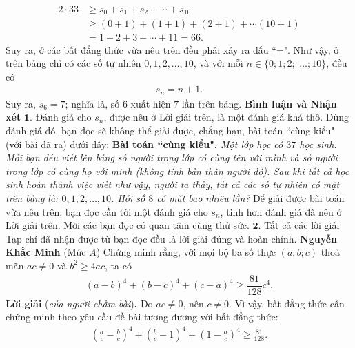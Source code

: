 \begin{multicols}{2}
	\begin{align*}
		2 \cdot 33 &\ge {s_0} + {s_1} + {s_2} +  \cdots  + {s_{10}} \\
		&\ge \left(\! {0 \!+\! 1}\! \right) \!+\! \left( \!{1 \!+\! 1} \!\right) \!+\! \left(\! {2 \!+\! 1} \!\right) \!+\!  \cdots \left(\! {10 \!+\! 1}\! \right) \\
		&= 1 + 2 + 3 +  \cdots  + 11 = 66.
	\end{align*}
	Suy ra, ở các bất đẳng thức vừa nêu trên đều phải xảy ra dấu ``=".
	\vskip 0.05cm
	Như vậy, ở trên bảng chỉ có các số tự nhiên $0, 1, 2, \ldots, 10$, và với mỗi $n \in \{0; 1; 2;$ $\ldots; 10\}$, đều có
	\begin{align*}
		{s_n} = n + 1.
	\end{align*}
	Suy ra, $s_6 = 7$; nghĩa là, số $6$ xuất hiện $7$ lần trên bảng.
	\vskip 0.05cm
	\textbf{\color{thachthuctoanhoc}Bình luận và Nhận xét}
	\vskip 0.05cm
	$\pmb{1.}$ Đánh giá cho $s_n$, được nêu ở Lời giải trên, là một đánh giá khá thô. Dùng đánh giá đó, bạn đọc sẽ không thể giải được, chẳng hạn, bài toán ``cùng kiểu" (với bài đã ra) dưới đây:
	\vskip 0.05cm
	\textbf{\color{thachthuctoanhoc}Bài toán ``cùng kiểu".} \textit{Một lớp học có $37$ học sinh. Mỗi bạn đều viết lên bảng số người trong lớp có cùng tên với mình và số người trong lớp có cùng họ với mình (không tính bản thân người đó). Sau khi tất cả học sinh hoàn thành việc viết như vậy, người ta thấy, tất cả các số tự nhiên có mặt trên bảng là: $0, 1, 2, \ldots, 10$. Hỏi số $8$ có mặt bao nhiêu lần?}
	\vskip 0.05cm
	Để giải được bài toán vừa nêu trên, bạn đọc cần tới một đánh giá cho $s_n$, tinh hơn đánh giá đã nêu ở Lời giải trên. Mời các bạn đọc có quan tâm cùng thử sức.
	\vskip 0.05cm
	$\pmb{2.}$ Tất cả các lời giải Tạp chí đã nhận được từ bạn đọc đều là lời giải đúng và hoàn chỉnh.
	\vskip 0.1cm
	\hfill	\textbf{\color{thachthuctoanhoc}Nguyễn Khắc Minh}
	\vskip 0.1cm
	{}
	(Mức $A$) Chứng minh rằng, với mọi bộ ba số thực $(a;b;c)$ thoả mãn  $ac\ne0$ và $b^2\ge4ac$, ta có
	\begin{align*}
		(a-b)^4+(b-c)^4+(c-a)^4 \ge \dfrac{81}{128}c^4.
	\end{align*}
	\textbf{\color{thachthuctoanhoc}Lời giải} (\textit{của người chấm bài})\textbf{\color{thachthuctoanhoc}.}
	\vskip 0.05cm
	Do $ac \ne 0$, nên $c \ne 0$. Vì vậy, bất đẳng thức cần chứng minh theo yêu cầu đề bài tương đương với bất đẳng thức:
	\begin{align*}
		{\left(\!\! {\frac{a}{c} \!-\! \frac{b}{c}} \!\!\right)^4} \!\!\!+\!\! {\left(\!\! {\frac{b}{c} \!-\! 1} \!\!\right)^4}\!\!\! +\!\! {\left(\!\! {1 \!-\! \frac{a}{c}} \!\!\right)^4} \!\ge\! \frac{{81}}{{128}}. \tag{$1$}

\end{align*}
\end{multicols}
